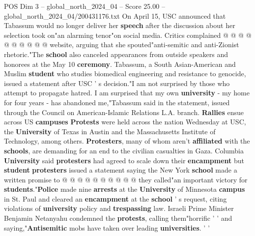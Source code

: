 \begin{textsample}{POS Dim 3 – global\_north\_2024\_04 – Score 25.00 – global\_north\_2024\_04/200431176.txt}
On April 15, USC announced that Tabassum would no longer deliver her \textbf{speech} after the discussion about her selection took on"an alarming tenor"on social media.
Critics complained @ @ @ @ @ @ @ @ @ @ website, arguing that she spouted"anti-semitic and anti-Zionist rhetoric."The \textbf{school} also canceled appearances from outside speakers and honorees at the May 10 \textbf{ceremony}.
Tabassum, a South Asian-American and Muslim \textbf{student} who studies biomedical engineering and resistance to genocide, issued a statement after USC ' s decision."I am not surprised by those who attempt to propagate hatred.
I am surprised that my own \textbf{university} - my home for four years - has abandoned me,"Tabassum said in the statement, issued through the Council on American-Islamic Relations L.A. branch. \textbf{Rallies} ensue across US \textbf{campuses} \textbf{Protests} were held across the nation Wednesday at USC, the \textbf{University} of Texas in Austin and the Massachusetts Institute of Technology, among others. \textbf{Protesters}, many of whom aren't \textbf{affiliated} with the \textbf{schools}, are demanding for an end to the civilian casualties in Gaza.
Columbia \textbf{University} said \textbf{protesters} had agreed to scale down their \textbf{encampment} but \textbf{student} \textbf{protesters} issued a statement saying the New York \textbf{school} made a written promise to @ @ @ @ @ @ @ @ @ @ they called"an important victory for \textbf{students}."\textbf{Police} made nine \textbf{arrests} at the \textbf{University} of Minnesota \textbf{campus} in St.
Paul and cleared an \textbf{encampment} at the \textbf{school} ' s request, citing violations of \textbf{university} policy and \textbf{trespassing} law.
Israeli Prime Minister Benjamin Netanyahu condemned the \textbf{protests}, calling them"horrific ' ' and saying,"\textbf{Antisemitic} mobs have taken over leading \textbf{universities}. ' '

\end{textsample}
